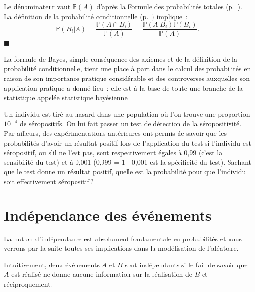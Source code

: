 \begin{preuve}
Le dénominateur vaut \(\mathbb{P}(A)\) d'après la
\protect\hyperref[I-formprobatot]{Formule des probabilités
totales (p.~\pageref*{I-formprobatot})}. La définition de la
\protect\hyperref[I-defprobacond]{probabilité
conditionnelle (p.~\pageref*{I-defprobacond})} implique~:
\begin{equation*}
\mathbb{P}(B_i | A) = \dfrac{\mathbb{P}(A \cap B_i)}{\mathbb{P}(A)} = \dfrac{\mathbb{P}(A | B_i) \mathbb{P}(B_i)}{\mathbb{P}(A)}.
\end{equation*}\hfill$\blacksquare$
\end{preuve}

\begin{remarque}\label{I-remarque}
La formule de Bayes, simple conséquence des axiomes et de la définition
de la probabilité conditionnelle, tient une place à part dans le calcul
des probabilités en raison de son importance pratique considérable et
des controverses auxquelles son application pratique a donné lieu~: elle
est à la base de toute une branche de la statistique appelée statistique
bayésienne.
\end{remarque}

\label{I-test}
Un individu est tiré au hasard dans une population où l'on trouve une
proportion \(10^{-4}\) de séropositifs. On lui fait passer un test de
détection de la séropositivité. Par ailleurs, des expérimentations
antérieures ont permis de savoir que les probabilités d'avoir un
résultat positif lors de l'application du test si l'individu est
séropositif, ou s'il ne l'est pas, sont respectivement égales à 0,99
(c'est la sensibilité du test) et à 0,001 (0,999 = 1 - 0,001 est la
spécificité du test). Sachant que le test donne un résultat positif,
quelle est la probabilité pour que l'individu soit effectivement
séropositif\,?

\section{Indépendance des
événements}\label{I-induxe9pendance-des-uxe9vuxe9nements}

La notion d'indépendance est absolument fondamentale en probabilités et
nous verrons par la suite toutes ses implications dans la modélisation
de l'aléatoire.

Intuitivement, deux événements \(A\) et \(B\) sont indépendants si le
fait de savoir que \(A\) est réalisé ne donne aucune information sur la
réalisation de \(B\) et réciproquement.

